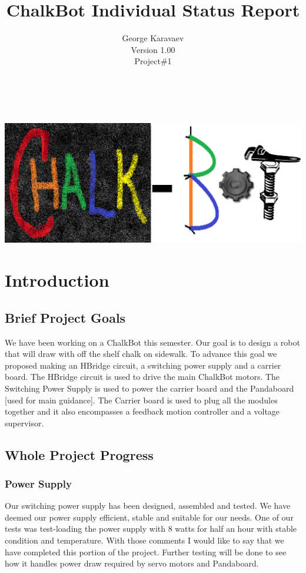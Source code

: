 \documentclass[12pt]{article}
\title{ChalkBot Individual Status Report}
\author{George Karavaev\\ \normalsize Version 1.00 \\Project\#1}
\begin{document}
  \maketitle 
\\
\\
{\centering
\includegraphics[width=1.0\textwidth]{../chalk_bot_logo2.png}
}
\newpage
 \tableofcontents
\listoffigures
\newpage
 \section{Introduction}
 \subsection{Brief Project Goals}
 We have been working on a ChalkBot this semester. Our goal is to design a robot that will draw with off the shelf chalk on sidewalk. To advance this goal we proposed making an HBridge circuit, a switching power supply and a carrier board. The HBridge circuit is used to drive the main ChalkBot motors. The Switching Power Supply is used to power the carrier board and the Pandaboard [used for main guidance]. The Carrier board is used to plug all the modules together and it also encompasses a feedback motion controller and a voltage supervisor.
\subsection{Whole Project Progress}
\subsubsection{Power Supply}
Our switching power supply has been designed, assembled and tested. We have deemed our power supply efficient, stable and suitable for our needs. One of our tests was test-loading the power supply with 8 watts for half an hour with stable condition and temperature. With those comments I would like to say that we have completed this portion of the project. Further testing will be done to see how it handles power draw required by servo motors and Pandaboard.
\end{document}
